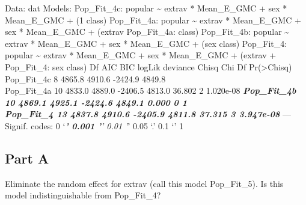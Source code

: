 \documentclass[]{article}
\begin{document}
Data: dat Models: Pop\_Fit\_4c: popular \textasciitilde{} extrav *
Mean\_E\_GMC + sex * Mean\_E\_GMC + (1 \textbar{} class) Pop\_Fit\_4a:
popular \textasciitilde{} extrav * Mean\_E\_GMC + sex * Mean\_E\_GMC +
(extrav \textbar{} Pop\_Fit\_4a: class) Pop\_Fit\_4b: popular
\textasciitilde{} extrav * Mean\_E\_GMC + sex * Mean\_E\_GMC + (sex
\textbar{} class) Pop\_Fit\_4: popular \textasciitilde{} extrav *
Mean\_E\_GMC + sex * Mean\_E\_GMC + (extrav + Pop\_Fit\_4: sex
\textbar{} class) Df AIC BIC logLik deviance Chisq Chi Df
Pr(\textgreater{}Chisq)\\
Pop\_Fit\_4c 8 4865.8 4910.6 -2424.9 4849.8\\
Pop\_Fit\_4a 10 4833.0 4889.0 -2406.5 4813.0 36.802 2 1.020e-08
\textbf{\emph{ Pop\_Fit\_4b 10 4869.1 4925.1 -2424.6 4849.1 0.000 0 1\\
Pop\_Fit\_4 13 4837.8 4910.6 -2405.9 4811.8 37.315 3 3.947e-08 }} ---
Signif. codes: 0 `\emph{\textbf{' 0.001 '}' 0.01 '}' 0.05 `.' 0.1 `' 1

\subsection{Part A}\label{part-a-3}

Eliminate the random effect for extrav (call this model Pop\_Fit\_5). Is
this model indistinguishable from Pop\_Fit\_4?
\end{document}

